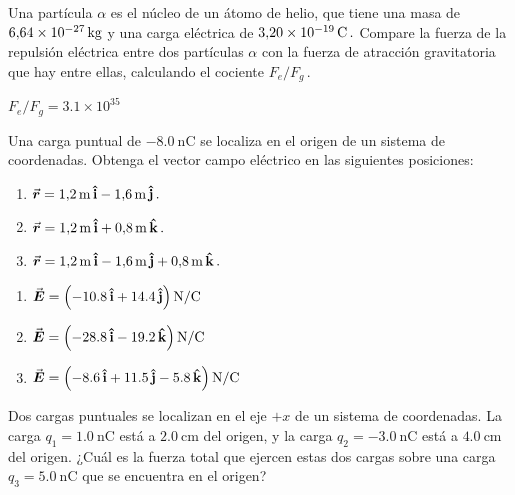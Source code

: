 \setcounter{figure}{0}

\begin{Exercise}
  Una partícula $\alpha$ es el núcleo de un átomo de helio, que tiene una masa de $\SI{6.64E-27}{\kilogram}$ y una carga eléctrica de $\SI{3.20E-19}{\coulomb}\,.$ Compare la fuerza de la repulsión eléctrica entre dos partículas $\alpha$ con la fuerza de atracción gravitatoria que hay entre ellas, calculando el cociente $F_e/F_g\,.$
\end{Exercise}
\begin{Answer}
  $F_e/F_g = 3.1\times 10^{35}$
\end{Answer}
%
\begin{Exercise}
  Una carga puntual de $\SI{-8.0}{\nano\coulomb}$ se localiza en el origen de un sistema de coordenadas. Obtenga el vector campo eléctrico en las siguientes posiciones:
  \begin{enumerate}[label=(\roman*)]
    \item $\va*{r} = \SI{1.2}{\metre}\,\vu{i} - \SI{1.6}{\metre}\,\vu{j}\,.$\par
    \item $\va*{r} = \SI{1.2}{\metre}\,\vu{i} + \SI{0.8}{\metre}\,\vu{k}\,.$\par
    \item $\va*{r} = \SI{1.2}{\metre}\,\vu{i} - \SI{1.6}{\metre}\,\vu{j} + \SI{0.8}{\metre}\,\vu{k}\,.$
  \end{enumerate}
\end{Exercise}
\begin{Answer}
  \begin{minipage}[t]{.5\textwidth}
    \begin{enumerate}[label=(\roman*)]
      \item $\va*{E} = \left ( -10.8\,\vu{i} + 14.4\,\vu{j}\right )\si{N/C}$\\
      \item $\va*{E} = \left ( -28.8\,\vu{i}  -19.2\,\vu{k}\right )\si{N/C}$\\
      \item  $\va*{E} = \left ( -8.6\,\vu{i} + 11.5\,\vu{j} - 5.8\,\vu{k}\right )\si{N/C}$
  \end{enumerate}
\end{minipage}


\end{Answer}
%
\begin{Exercise}
Dos cargas puntuales se localizan en el eje $+x$ de un sistema de coordenadas. La carga $q_1 = \SI{1.0}{\nano\coulomb}$ está a $\SI{2.0}{\centi\metre}$ del origen, y la carga $q_2 = \SI{-3.0}{\nano\coulomb}$ está a $\SI{4.0}{\centi\metre}$ del origen. ¿Cuál es la fuerza total que ejercen estas dos cargas sobre una carga $q_3 = \SI{5.0}{\nano\coulomb}$ que se encuentra en el origen?
\end{Exercise}
